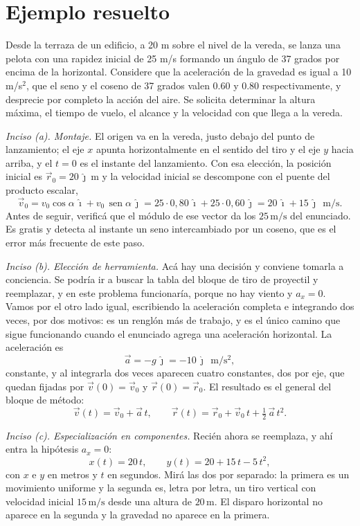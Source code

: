 \documentclass[11pt,openany]{book}
\newcommand{\sen}{\operatorname{sen}}
\begin{document}
\section{Ejemplo resuelto}

\begin{ejemplo}[completo]
Desde la terraza de un edificio, a 20 m sobre el nivel de la vereda, se lanza una pelota con una rapidez inicial de 25 m/s formando un ángulo de 37 grados por encima de la horizontal. Considere que la aceleración de la gravedad es igual a 10 m/s$^2$, que el seno y el coseno de 37 grados valen 0.60 y 0.80 respectivamente, y desprecie por completo la acción del aire. Se solicita determinar la altura máxima, el tiempo de vuelo, el alcance y la velocidad con que llega a la vereda.

\medskip
\textit{Inciso (a). Montaje.} El origen va en la vereda, justo debajo del punto de lanzamiento; el eje $x$ apunta horizontalmente en el sentido del tiro y el eje $y$ hacia arriba, y el $t=0$ es el instante del lanzamiento. Con esa elección, la posición inicial es $\vec r_0 = 20\,\hat\jmath\ \mathrm{m}$ y la velocidad inicial se descompone con el puente del producto escalar,
\[
\vec v_0 = v_0\cos\alpha\,\hat\imath + v_0\,\sen\alpha\,\hat\jmath = 25\cdot 0{,}80\,\hat\imath + 25\cdot 0{,}60\,\hat\jmath = 20\,\hat\imath + 15\,\hat\jmath \ \ \mathrm{m/s}.
\]
Antes de seguir, verificá que el módulo de ese vector da los $25\,\mathrm{m/s}$ del enunciado. Es gratis y detecta al instante un seno intercambiado por un coseno, que es el error más frecuente de este paso.

\medskip
\textit{Inciso (b). Elección de herramienta.} Acá hay una decisión y conviene tomarla a conciencia. Se podría ir a buscar la tabla del bloque de tiro de proyectil y reemplazar, y en este problema funcionaría, porque no hay viento y $a_x = 0$. Vamos por el otro lado igual, escribiendo la aceleración completa e integrando dos veces, por dos motivos: es un renglón más de trabajo, y es el único camino que sigue funcionando cuando el enunciado agrega una aceleración horizontal. La aceleración es
\[
\vec a = -g\,\hat\jmath = -10\,\hat\jmath\ \ \mathrm{m/s^2},
\]
constante, y al integrarla dos veces aparecen cuatro constantes, dos por eje, que quedan fijadas por $\vec v(0) = \vec v_0$ y $\vec r(0) = \vec r_0$. El resultado es el general del bloque de método:
\[
\vec v(t) = \vec v_0 + \vec a\,t, \qquad \vec r(t) = \vec r_0 + \vec v_0\,t + \tfrac12\,\vec a\,t^2.
\]

\medskip
\textit{Inciso (c). Especialización en componentes.} Recién ahora se reemplaza, y ahí entra la hipótesis $a_x = 0$:
\[
x(t) = 20\,t, \qquad y(t) = 20 + 15\,t - 5\,t^2,
\]
con $x$ e $y$ en metros y $t$ en segundos. Mirá las dos por separado: la primera es un movimiento uniforme y la segunda es, letra por letra, un tiro vertical con velocidad inicial $15\,\mathrm{m/s}$ desde una altura de $20\,\mathrm{m}$. El disparo horizontal no aparece en la segunda y la gravedad no aparece en la primera.


\end{ejemplo}
\end{document}
